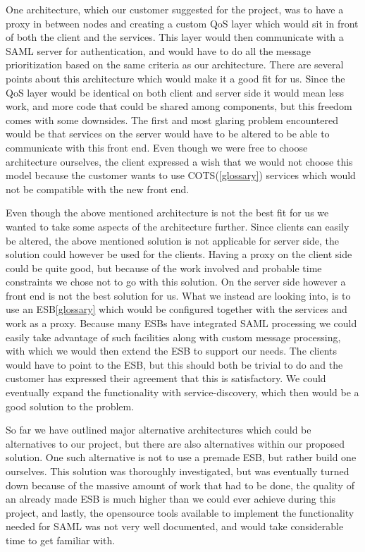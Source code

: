 \documentclass[12pt]{article}
\begin{document}
        One architecture, which our customer suggested for the project, was to have a proxy in between nodes and creating a custom QoS layer which would sit in front of both the client and the services. This layer would then communicate with a SAML server for authentication, and would have to do all the message prioritization based on the same criteria as our architecture. There are several points about this architecture which would make it a good fit for us. Since the QoS layer would be identical on both client and server side it would mean less work, and more code that could be shared among components, but this freedom comes with some downsides. The first and most glaring problem encountered would be that services on the server would have to be altered to be able to communicate with this front end. Even though we were free to choose architecture ourselves, the client expressed a wish that we would not choose this model because the customer wants to use COTS(\ref{glossary}) services which would not be compatible with the new front end.

        Even though the above mentioned architecture is not the best fit for us we wanted to take some aspects of the architecture further. Since clients can easily be altered, the above mentioned solution is not applicable for server side, the solution could however be used for the clients. Having a proxy on the client side could be quite good, but because of the work involved and probable time constraints we chose not to go with this solution. On the server side however a front end is not the best solution for us. What we instead are looking into, is to use an ESB\ref{glossary} which would be configured together with the services and work as a proxy. Because many ESBs have integrated SAML processing we could easily take advantage of such facilities along with custom message processing, with which we would then extend the ESB to support our needs. The clients would have to point to the ESB, but this should both be trivial to do and the customer has expressed their agreement that this is satisfactory. We could eventually expand the functionality with service-discovery, which then would be a good solution to the problem.

        So far we have outlined major alternative architectures which could be alternatives to our project, but there are also alternatives within our proposed solution. One such alternative is not to use a premade ESB, but rather build one ourselves. This solution was thoroughly investigated, but was eventually turned down because of the massive amount of work that had to be done, the quality of an already made ESB is much higher than we could ever achieve during this project, and lastly, the opensource tools available to implement the functionality needed for SAML was not very well documented, and would take considerable time to get familiar with.
\end{document}
